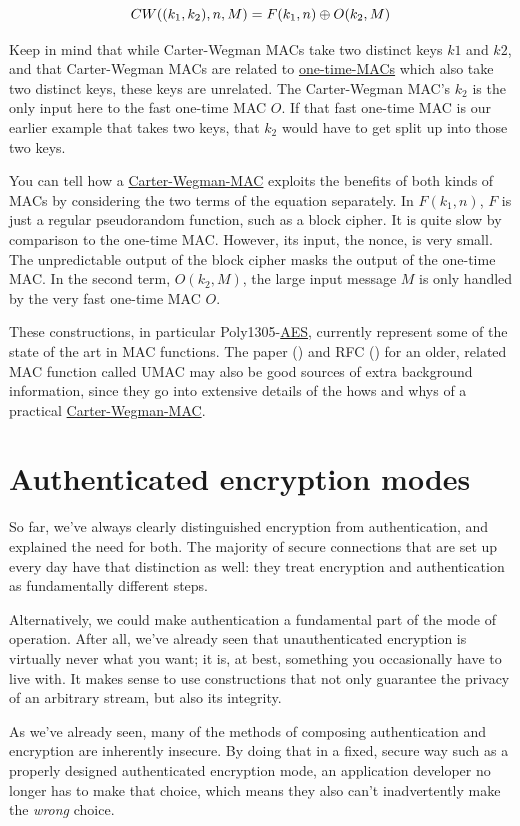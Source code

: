 \documentclass[11pt,ebook,table,dvipsnames]{memoir}
\begin{document}
\[
CW((k_1, k_2), n, M) = F(k_1, n) \oplus O(k_2, M)
\]

Keep in mind that while Carter-Wegman MACs take two distinct keys $k1$
and $k2$, and that Carter-Wegman MACs are related to \hyperref[One-time MACs]{one-time-MACs}
which also take two distinct keys, these keys are unrelated. The
Carter-Wegman MAC's $k_2$ is the only input here to the fast one-time
MAC $O$. If that fast one-time MAC is our earlier example that takes
two keys, that $k_2$ would have to get split up into those two keys.

You can tell how a \hyperref[Carter-Wegman MAC]{Carter-Wegman-MAC} exploits the benefits of both
kinds of MACs by considering the two terms of the equation separately.
In $F(k_1, n)$, $F$ is just a regular pseudorandom function, such as a
block cipher. It is quite slow by comparison to the one-time MAC.
However, its input, the nonce, is very small. The unpredictable output
of the block cipher masks the output of the one-time MAC. In the
second term, $O(k_2, M)$, the large input message $M$ is only handled
by the very fast one-time MAC $O$.

These constructions, in particular Poly1305-\hyperref[AES]{AES}, currently represent
some of the state of the art in MAC functions. The paper (\cite{umac})
and RFC (\cite{rfc4418}) for an older, related MAC function called
UMAC may also be good sources of extra background information, since
they go into extensive details of the hows and whys of a practical
\hyperref[Carter-Wegman MAC]{Carter-Wegman-MAC}.
\section{Authenticated encryption modes}
\label{sec-2-7-7}

So far, we've always clearly distinguished encryption from
authentication, and explained the need for both. The majority of
secure connections that are set up every day have that distinction as
well: they treat encryption and authentication as fundamentally
different steps.

Alternatively, we could make authentication a fundamental part of the
mode of operation. After all, we've already seen that unauthenticated
encryption is virtually never what you want; it is, at best, something
you occasionally have to live with. It makes sense to use
constructions that not only guarantee the privacy of an arbitrary
stream, but also its integrity.

As we've already seen, many of the methods of composing authentication
and encryption are inherently insecure. By doing that in a fixed,
secure way such as a properly designed authenticated encryption mode,
an application developer no longer has to make that choice, which
means they also can't inadvertently make the \emph{wrong} choice.
\end{document}
